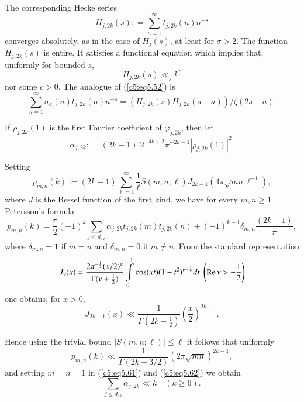 The corresponding Hecke series
\begin{equation}
H_{j,2k} (s) : = \sum\limits^\infty_{n=1} t_{j,2k}(n) n^{-s}
\label{c5:eq5.57} 
\end{equation}
converges absolutely, as in the case of $H_j(s)$, at least for $\sigma
>2$. The function $H_{j,2k} (s)$ is entire. It satisfies a functional
equation which implies that, uniformly for bounded $s$,  
\begin{equation}
H_{j,2k} (s) \ll_{j} k^c\label{c5:eq5.58}
\end{equation}
nor some $c > 0$. The analogue of (\ref{c5:eq5.52}) is
\begin{equation}
\sum\limits^\infty_{n=1} \sigma_a(n) t_{j,2k} (n) n^{-s} = (H_{j,2k}
(s) H_{j,2k} (s-a))/ \zeta(2s-a).\label{c5:eq5.59} 
\end{equation}

If $\rho_{j, 2k}(1)$ is the first Fourier coefficient of
$\varphi_{j,2k}$, then let 
$$
\alpha_{j,2k}: = (2k -1)! 2^{-4k+2} \pi^{-2k-1} |\rho_{j, 2k} (1)|^2.
$$

Setting
\begin{equation}
p_{m,n} (k) := (2k-1) \sum\limits^\infty_{\ell=1} \frac{1}{\ell}
S(m,n;\ell) J_{2k-1} \left(4\pi \sqrt{mn} \ell^{-1}\right),
\label{c5:eq5.60} 
\end{equation}
where $J$ is the Bessel function of the first kind, we have for every
$m,n \geq 1$ Petersson's formula 
{\fontsize{10pt}{12pt}\selectfont
\begin{equation}
p_{m,n} (k) = \frac{\pi}{2} (-1)^k \sum\limits_{j \leq d_{2k}}
\alpha_{j,2k} t_{j,2k} (m) t_{j,2k} (n) + (-1)^{k-1} \delta_{m,n}
\frac{(2k-1)}{\pi},\label{c5:eq5.61} 
\end{equation}}
where $\delta_{m,n} =1$ if $m=n$ and $\delta_{m,n} = 0$ if $m \neq
n$. From the standard representation  
$$ 
J_\nu (x) = \frac{2\pi^{-\frac{1}{2}}(x/2)^{\nu}}{\Gamma
  (\nu+\frac{1}{2})} \int\limits^1_0 \cos (xt)
(1-t^2)^{\nu-\frac{1}{2}} dt \; \left(\operatorname{Re} \nu > -\frac{1}{2}\right) 
$$  
one obtains, for $x > 0$,
$$
J_{2k-1}  (x) \ll \frac{1}{\Gamma (2k-\frac{1}{2})} \left(\frac{x}{2}
\right)^{2k-1}. 
$$\pageoriginale

Hence using the trivial bound $|S(m,n;\ell)| \leq \ell$ it follows
that uniformly 
\begin{equation}
p_{m,n} (k) \ll \frac{1}{\Gamma(2k - 3/2)} (2\pi \sqrt{mn})^{2k-1},
\label{c5:eq5.62} 
\end{equation}
and setting $m=n=1$ in (\ref{c5:eq5.61}) and (\ref{c5:eq5.62}) we
obtain 
$$
\sum\limits_{j \leq d_{2k}} \alpha_{j,2k} \ll k \quad (k \geq 6).
$$

